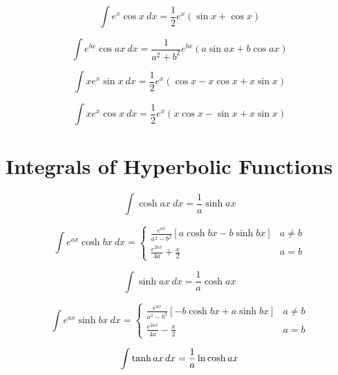 \documentclass[12pt,letterpaper,leqno]{article}
\begin{document}
\begin{equation}
\int e^x \cos x\ dx = \frac{1}{2}e^x (\sin x + \cos x)  
\end{equation}

\begin{equation}
\int e^{bx} \cos ax\ dx = \frac{1}{a^2 + b^2} e^{bx} ( a \sin ax + b \cos ax ) 
\end{equation}

\begin{equation}
\int x e^x \sin x\ dx = \frac{1}{2}e^x (\cos x - x \cos x + x \sin x) 
\end{equation}

\begin{equation}
\int x e^x \cos x\ dx = \frac{1}{2}e^x (x \cos x 
- \sin x + x \sin x) 
\end{equation}

 \section*{Integrals of Hyperbolic Functions}

\begin{equation}
\int \cosh ax\ dx =\frac{1}{a} \sinh ax 
\end{equation}

\begin{equation}
\int e^{ax}  \cosh bx \ dx = 
\begin{cases}
\displaystyle{\frac{e^{ax}}{a^2-b^2} }[ a \cosh bx - b \sinh bx ]  & a\ne b \\
\displaystyle{\frac{e^{2ax}}{4a} + \frac{x}{2}}  & a = b
\end{cases}
\end{equation}

\begin{equation}
\int \sinh ax\ dx = \frac{1}{a} \cosh ax 
\end{equation}

\begin{equation}
\int e^{ax} \sinh bx \ dx =
\begin{cases}
\displaystyle{\frac{e^{ax}}{a^2-b^2} }[ -b \cosh bx + a \sinh bx ]  & a\ne b \\
\displaystyle{\frac{e^{2ax}}{4a} - \frac{x}{2}}  & a = b
\end{cases}
\end{equation}


\begin{equation}\label{eq:yates}
\int  \tanh ax\hspace{1.5pt} dx =\frac{1}{a} \ln \cosh ax 
\end{equation}
\end{document}
